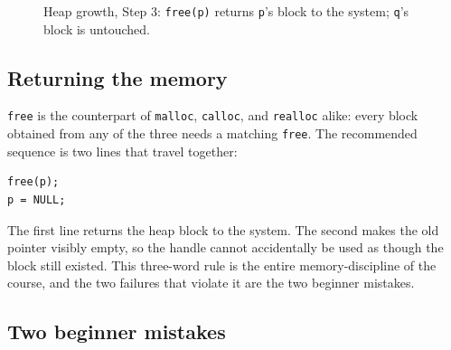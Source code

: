 \documentclass[11pt]{article}
\begin{document}
\begin{figure}[h]
  \centering
  \caption{Heap growth, Step 3: \texttt{free(p)} returns \texttt{p}'s block to
  the system; \texttt{q}'s block is untouched.}
  \label{fig:heap3}
\end{figure}

\subsection{Returning the memory}

\texttt{free} is the counterpart of \texttt{malloc}, \texttt{calloc}, and
\texttt{realloc} alike: every block obtained from any of the three needs a
matching \texttt{free}. The recommended sequence is two lines that travel
together:

{\footnotesize
\begin{verbatim}
free(p);
p = NULL;
\end{verbatim}
}

The first line returns the heap block to the system. The second makes the old
pointer visibly empty, so the handle cannot accidentally be used as though the
block still existed.  This three-word
rule is the entire memory-discipline of the course, and the two failures that
violate it are the two beginner mistakes.

\subsection{Two beginner mistakes}
\end{document}
